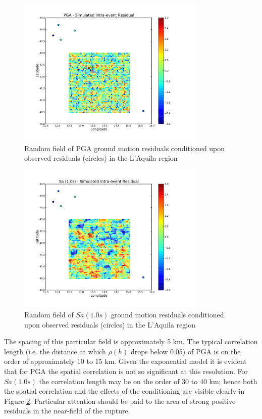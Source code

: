 \begin{figure}[htb]
	\centering
		\includegraphics[trim=10mm 10mm 10mm 10mm, clip, width=0.8\textwidth]{./figures/hazard/LAquila_Simulated_Epison_PGA.pdf}
	\caption{Random field of PGA ground motion residuals conditioned upon observed residuals (circles) in the L'Aquila region}
	\label{fig:laquila_epsilon_pga}
\end{figure}
\begin{figure}[htb]
	\centering
		\includegraphics[trim=10mm 10mm 10mm 10mm, clip, width=0.8\textwidth]{./figures/hazard/LAquila_Simulated_Epsilon_Sa1.pdf}
	\caption{Random field of $Sa \left( {1.0 s} \right)$ ground motion residuals conditioned upon observed residuals (circles) in the L'Aquila region}
	\label{fig:laquila_epsilon_sa1}
\end{figure}

The spacing of this particular field is approximately 5 km. The typical correlation length (i.e. the distance at which $\rho \left( h \right)$ drops below 0.05) of PGA is on the order of approximately 10 to 15 km. Given the exponential model it is evident that for PGA the spatial correlation is not so significant at this resolution. For $Sa \left( {1.0 s} \right)$ the correlation length may be on the order of 30 to 40 km; hence both the spatial correlation and the effects of the conditioning are visible clearly in Figure \ref{fig:laquila_epsilon_sa1}. Particular attention should be paid to the area of strong positive residuals in the near-field of the rupture.

